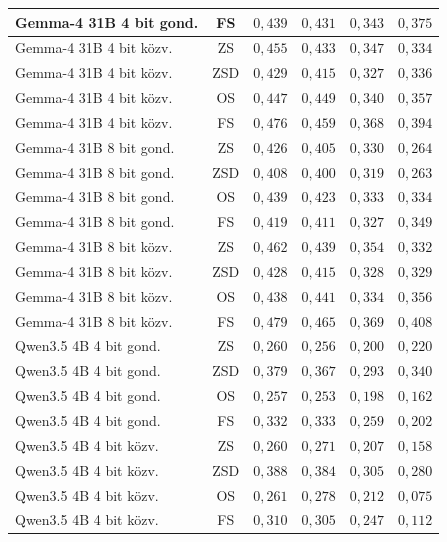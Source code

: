 \documentclass[
]{elteikthesis}[2024/04/26]
\begin{document}
\begin{longtable}{ | l | c | r | r | r | r | }
	\hline
	Gemma-4 31B 4 bit gond. & FS & $0{,}439$ & $0{,}431$ & $0{,}343$ & $0{,}375$ \\
	\hline
	Gemma-4 31B 4 bit közv. & ZS & $0{,}455$ & $0{,}433$ & $0{,}347$ & $0{,}334$ \\
	\hline
	Gemma-4 31B 4 bit közv. & ZSD & $0{,}429$ & $0{,}415$ & $0{,}327$ & $0{,}336$ \\
	\hline
	Gemma-4 31B 4 bit közv. & OS & $0{,}447$ & $0{,}449$ & $0{,}340$ & $0{,}357$ \\
	\hline
	Gemma-4 31B 4 bit közv. & FS & $0{,}476$ & $0{,}459$ & $0{,}368$ & $0{,}394$ \\
	\hline
	Gemma-4 31B 8 bit gond. & ZS & $0{,}426$ & $0{,}405$ & $0{,}330$ & $0{,}264$ \\
	\hline
	Gemma-4 31B 8 bit gond. & ZSD & $0{,}408$ & $0{,}400$ & $0{,}319$ & $0{,}263$ \\
	\hline
	Gemma-4 31B 8 bit gond. & OS & $0{,}439$ & $0{,}423$ & $0{,}333$ & $0{,}334$ \\
	\hline
	Gemma-4 31B 8 bit gond. & FS & $0{,}419$ & $0{,}411$ & $0{,}327$ & $0{,}349$ \\
	\hline
	Gemma-4 31B 8 bit közv. & ZS & $0{,}462$ & $0{,}439$ & $0{,}354$ & $0{,}332$ \\
	\hline
	Gemma-4 31B 8 bit közv. & ZSD & $0{,}428$ & $0{,}415$ & $0{,}328$ & $0{,}329$ \\
	\hline
	Gemma-4 31B 8 bit közv. & OS & $0{,}438$ & $0{,}441$ & $0{,}334$ & $0{,}356$ \\
	\hline
	Gemma-4 31B 8 bit közv. & FS & $0{,}479$ & $0{,}465$ & $0{,}369$ & $0{,}408$ \\
	\hline
	Qwen3.5 4B 4 bit gond. & ZS & $0{,}260$ & $0{,}256$ & $0{,}200$ & $0{,}220$ \\
	\hline
	Qwen3.5 4B 4 bit gond. & ZSD & $0{,}379$ & $0{,}367$ & $0{,}293$ & $0{,}340$ \\
	\hline
	Qwen3.5 4B 4 bit gond. & OS & $0{,}257$ & $0{,}253$ & $0{,}198$ & $0{,}162$ \\
	\hline
	Qwen3.5 4B 4 bit gond. & FS & $0{,}332$ & $0{,}333$ & $0{,}259$ & $0{,}202$ \\
	\hline
	Qwen3.5 4B 4 bit közv. & ZS & $0{,}260$ & $0{,}271$ & $0{,}207$ & $0{,}158$ \\
	\hline
	Qwen3.5 4B 4 bit közv. & ZSD & $0{,}388$ & $0{,}384$ & $0{,}305$ & $0{,}280$ \\
	\hline
	Qwen3.5 4B 4 bit közv. & OS & $0{,}261$ & $0{,}278$ & $0{,}212$ & $0{,}075$ \\
	\hline
	Qwen3.5 4B 4 bit közv. & FS & $0{,}310$ & $0{,}305$ & $0{,}247$ & $0{,}112$ \\

\end{longtable}
\end{document}
